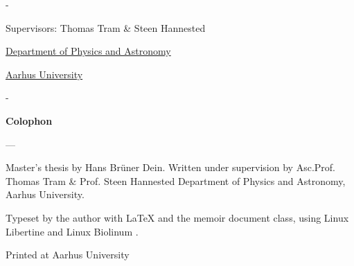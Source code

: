 \begin{titlingpage}
\begin{adjustwidth*}{\frontpagecorrection-2cm}{-\frontpagecorrection-2cm}
    \vspace{1cm}

    \fontsize{16pt}{20pt}\selectfont
    \par
    \par

    \bigskip

    \fontsize{14pt}{18pt}\selectfont
    \par
    \par
    \vfill

    Supervisors: Thomas Tram \& Steen Hannested\par

    \vfill

    \fontsize{12pt}{14.5pt}\selectfont
    \href{https://www.phys.au.dk/}{Department of Physics and Astronomy}\par
    \href{https://www.au.dk/}{Aarhus University}

  \end{adjustwidth*}

  \newpage
  \begin{adjustwidth*}{\frontpagecorrection}{-\frontpagecorrection}
    \thispagestyle{empty}
    \strut\vfill
    {
      \setlength{\parindent}{0pt}
      \addtolength{\parskip}{.6em}

      \begin{center}
        \bfseries\sffamily Colophon
      \end{center}

      \small

      \textsl{\projecttitle}

      {--- \textsl{\projecttitledanish}}

      \smallskip

      Master's thesis by Hans Br{\"u}ner Dein. Written under supervision by Asc.Prof. Thomas Tram \& Prof. Steen Hannested
      Department of Physics and Astronomy, Aarhus University.

      Typeset by the author with \LaTeX{} and the \textsf{memoir} document class,
      using Linux Libertine and Linux Biolinum {\fontandleading}.

      Printed at Aarhus University
    }
  \end{adjustwidth*}
\end{titlingpage}


